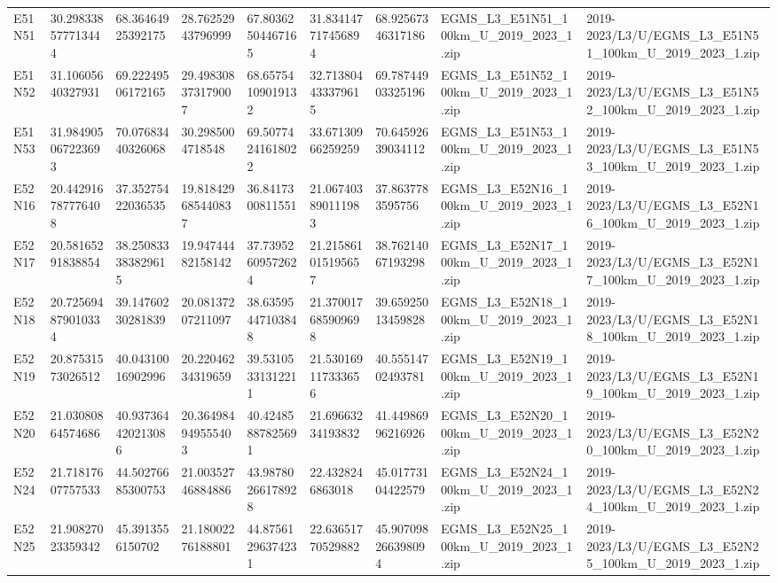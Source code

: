 \begin{landscape}
\begin{longtable}{lllllllll}
E51N51 & 30.298338577713444 & 68.36464925392175 & 28.76252943796999 & 67.80362504467165 & 31.834147717456894 & 68.92567346317186 & EGMS\_L3\_E51N51\_100km\_U\_2019\_2023\_1.zip & 2019-2023/L3/U/EGMS\_L3\_E51N51\_100km\_U\_2019\_2023\_1.zip \\
E51N52 & 31.10605640327931 & 69.22249506172165 & 29.498308373179007 & 68.65754109019132 & 32.713804433379615 & 69.78744903325196 & EGMS\_L3\_E51N52\_100km\_U\_2019\_2023\_1.zip & 2019-2023/L3/U/EGMS\_L3\_E51N52\_100km\_U\_2019\_2023\_1.zip \\
E51N53 & 31.984905067223693 & 70.07683440326068 & 30.2985004718548 & 69.50774241618022 & 33.67130966259259 & 70.64592639034112 & EGMS\_L3\_E51N53\_100km\_U\_2019\_2023\_1.zip & 2019-2023/L3/U/EGMS\_L3\_E51N53\_100km\_U\_2019\_2023\_1.zip \\
E52N16 & 20.442916787776408 & 37.35275422036535 & 19.818429685440837 & 36.8417300811551 & 21.067403890111983 & 37.8637783595756 & EGMS\_L3\_E52N16\_100km\_U\_2019\_2023\_1.zip & 2019-2023/L3/U/EGMS\_L3\_E52N16\_100km\_U\_2019\_2023\_1.zip \\
E52N17 & 20.58165291838854 & 38.250833383829615 & 19.94744482158142 & 37.73952609572624 & 21.215861015195657 & 38.76214067193298 & EGMS\_L3\_E52N17\_100km\_U\_2019\_2023\_1.zip & 2019-2023/L3/U/EGMS\_L3\_E52N17\_100km\_U\_2019\_2023\_1.zip \\
E52N18 & 20.725694879010334 & 39.14760230281839 & 20.08137207211097 & 38.63595447103848 & 21.370017685909698 & 39.65925013459828 & EGMS\_L3\_E52N18\_100km\_U\_2019\_2023\_1.zip & 2019-2023/L3/U/EGMS\_L3\_E52N18\_100km\_U\_2019\_2023\_1.zip \\
E52N19 & 20.87531573026512 & 40.04310016902996 & 20.22046234319659 & 39.53105331312211 & 21.530169117333656 & 40.55514702493781 & EGMS\_L3\_E52N19\_100km\_U\_2019\_2023\_1.zip & 2019-2023/L3/U/EGMS\_L3\_E52N19\_100km\_U\_2019\_2023\_1.zip \\
E52N20 & 21.03080864574686 & 40.937364420213086 & 20.364984949555403 & 40.42485887825691 & 21.69663234193832 & 41.44986996216926 & EGMS\_L3\_E52N20\_100km\_U\_2019\_2023\_1.zip & 2019-2023/L3/U/EGMS\_L3\_E52N20\_100km\_U\_2019\_2023\_1.zip \\
E52N24 & 21.71817607757533 & 44.50276685300753 & 21.00352746884886 & 43.98780266178928 & 22.4328246863018 & 45.01773104422579 & EGMS\_L3\_E52N24\_100km\_U\_2019\_2023\_1.zip & 2019-2023/L3/U/EGMS\_L3\_E52N24\_100km\_U\_2019\_2023\_1.zip \\
E52N25 & 21.90827023359342 & 45.3913556150702 & 21.18002276188801 & 44.87561296374231 & 22.63651770529882 & 45.907098266398094 & EGMS\_L3\_E52N25\_100km\_U\_2019\_2023\_1.zip & 2019-2023/L3/U/EGMS\_L3\_E52N25\_100km\_U\_2019\_2023\_1.zip \\

\end{longtable}
\end{landscape}
